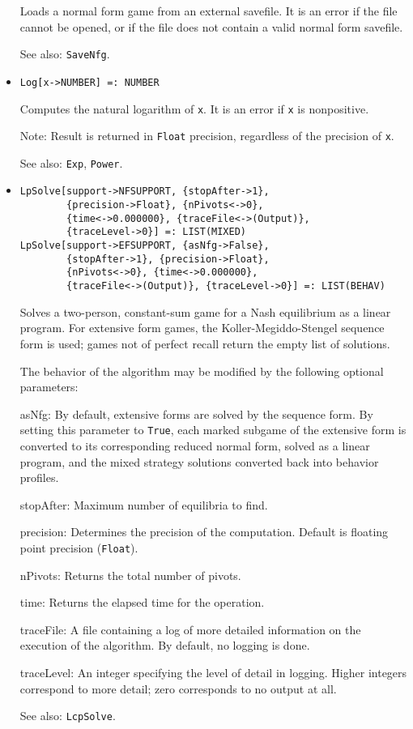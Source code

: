 \begin{itemize}
\bd
Loads a normal form game from an external savefile.
It is an error if the file cannot be opened, or if the file does not 
contain a valid normal form savefile.
\item [See also:] \verb+SaveNfg+.
\ed

\item{}
\protect \large \begin{verbatim}
Log[x->NUMBER] =: NUMBER 
\end{verbatim} \normalsize

\bd
Computes the natural logarithm of \verb+x+.  It is an error if
\verb+x+ is nonpositive.
\item [Note:] Result is returned in \verb+Float+ precision, regardless of
the precision of \verb+x+.
\item [See also:] \verb+Exp+, \verb+Power+.
\ed

\item{}
\protect \large \begin{verbatim}
LpSolve[support->NFSUPPORT, {stopAfter->1}, 
        {precision->Float}, {nPivots<->0}, 
        {time<->0.000000}, {traceFile<->(Output)}, 
        {traceLevel->0}] =: LIST(MIXED) 
LpSolve[support->EFSUPPORT, {asNfg->False}, 
        {stopAfter->1}, {precision->Float}, 
        {nPivots<->0}, {time<->0.000000}, 
        {traceFile<->(Output)}, {traceLevel->0}] =: LIST(BEHAV) 
\end{verbatim}\normalsize

\bd
Solves a two-person, constant-sum game for a Nash equilibrium as a linear
program.  For extensive form games, the Koller-Megiddo-Stengel
sequence form is used; games not of perfect recall return the empty
list of solutions.

The behavior of the algorithm may be modified by the following optional
parameters:
\bd
\item
[asNfg:] By default, extensive forms are solved by the sequence form.
By setting this parameter to \verb+True+, each marked subgame of the
extensive form is converted to its corresponding reduced normal form,
solved as a linear program, and the mixed strategy solutions converted back
into behavior profiles.
\item
[stopAfter:] Maximum number of equilibria to find.  
\item
[precision:] Determines the precision of the computation. Default is
floating point precision (\verb+Float+). 
\item
[nPivots:] Returns the total number of pivots.
\item
[time:] Returns the elapsed time for the operation.
\item
[traceFile:] A file containing a log of more detailed information on the
execution of the algorithm.  By default, no logging is done.
\item
[traceLevel:] An integer specifying the level of detail in logging.
Higher integers correspond to more detail; zero corresponds to no
output at all.
\ed
\item [See also:] \verb+LcpSolve+.
\ed


\end{itemize}
